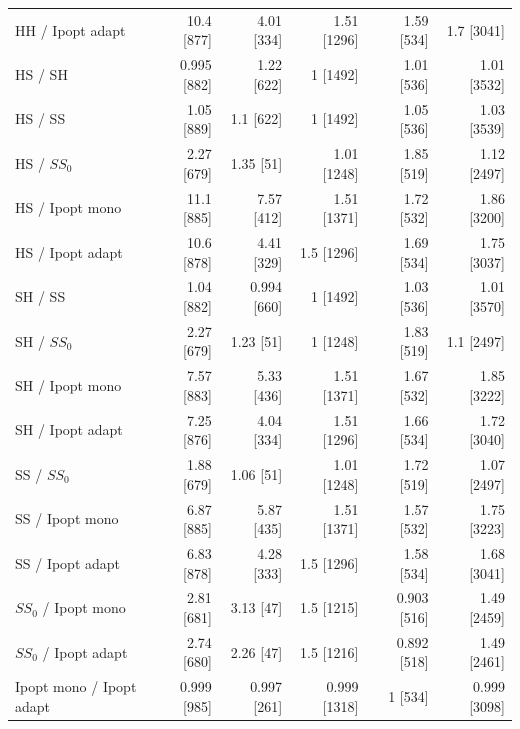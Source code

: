 \documentclass[pdflatex,sn-mathphys-num]{sn-jnl}
\theoremstyle{thmstyleone}
\theoremstyle{thmstylethree}
\newenvironment{scaledtable}[1][tbp]{\begin{tableorg}[#1]\centering}{\end{tableorg}}
\begin{document}
\begin{scaledtable}[!htbp]
{\begin{tabular}{@{}lrrrrr@{}}
HH / Ipopt adapt & 10.4 [877] & 4.01 [334] & 1.51 [1296] & 1.59 [534] & 1.7 [3041] \\
HS / SH & 0.995 [882] & 1.22 [622] & 1 [1492] & 1.01 [536] & 1.01 [3532] \\
HS / SS & 1.05 [889] & 1.1 [622] & 1 [1492] & 1.05 [536] & 1.03 [3539] \\
HS / $SS_0$ & 2.27 [679] & 1.35 [51] & 1.01 [1248] & 1.85 [519] & 1.12 [2497] \\
HS / Ipopt mono & 11.1 [885] & 7.57 [412] & 1.51 [1371] & 1.72 [532] & 1.86 [3200] \\
HS / Ipopt adapt & 10.6 [878] & 4.41 [329] & 1.5 [1296] & 1.69 [534] & 1.75 [3037] \\
SH / SS & 1.04 [882] & 0.994 [660] & 1 [1492] & 1.03 [536] & 1.01 [3570] \\
SH / $SS_0$ & 2.27 [679] & 1.23 [51] & 1 [1248] & 1.83 [519] & 1.1 [2497] \\
SH / Ipopt mono & 7.57 [883] & 5.33 [436] & 1.51 [1371] & 1.67 [532] & 1.85 [3222] \\
SH / Ipopt adapt & 7.25 [876] & 4.04 [334] & 1.51 [1296] & 1.66 [534] & 1.72 [3040] \\
SS / $SS_0$ & 1.88 [679] & 1.06 [51] & 1.01 [1248] & 1.72 [519] & 1.07 [2497] \\
SS / Ipopt mono & 6.87 [885] & 5.87 [435] & 1.51 [1371] & 1.57 [532] & 1.75 [3223] \\
SS / Ipopt adapt & 6.83 [878] & 4.28 [333] & 1.5 [1296] & 1.58 [534] & 1.68 [3041] \\
$SS_0$ / Ipopt mono & 2.81 [681] & 3.13 [47] & 1.5 [1215] & 0.903 [516] & 1.49 [2459] \\
$SS_0$ / Ipopt adapt & 2.74 [680] & 2.26 [47] & 1.5 [1216] & 0.892 [518] & 1.49 [2461] \\
Ipopt mono / Ipopt adapt & 0.999 [985] & 0.997 [261] & 0.999 [1318] & 1 [534] & 0.999 [3098] \\
\bottomrule
\end{tabular}

}
\end{scaledtable}

\FloatBarrier
\end{document}
